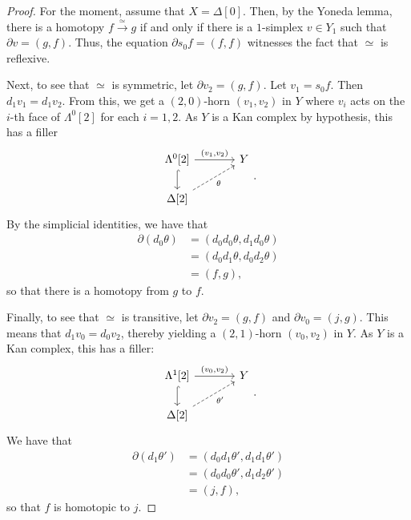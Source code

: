 \documentclass[10pt,letterpaper,cm]{nupset}
\theoremstyle{definition}
\theoremstyle{theorem}
\theoremstyle{remark}
\newcommand{\0}{\mathbf{0}}
\newcommand{\1}{\mathbf{1}}
\newcommand{\2}{\mathbf{2}}
\begin{document}
\begin{proof}
For the moment, assume that $X = \Delta[0]$. Then, by the Yoneda lemma, there is a homotopy $f \overset{\simeq}{\longrightarrow} g$ if and only if there is a $1$-simplex $v\in Y_1$ such that $\partial{v} = \left(g, f\right)$. Thus, the equation $\partial{s_0{f}} = \left(f, f\right)$ witnesses the fact that ${}\simeq{}$ is reflexive.

\medskip

Next, to see that ${}\simeq{}$  is symmetric, let $\partial{v_2} = \left(g,f\right)$. Let $v_1 = s_0{f}$. Then $d_1{v_1} = d_1{v_2}$. From this, we get a $\left(2,0\right)$-horn $\left(v_1, v_2\right)$  in $Y$ where $v_i$ acts on the $i$-th face of $ \Lambda^0[2]$ for each $i=1,2$. As $Y$ is a Kan complex by hypothesis, this has a filler
\[
\begin{tikzcd}[column sep=large]
{\Lambda^0[2]} \arrow[d, hook] \arrow[r, "{\left(v_1, v_2\right)}"] & Y \\
{\Delta[2]} \arrow[ru, "\theta"', dashed]                          &  
\end{tikzcd}
.\] By the simplicial identities, we have that 
\begin{align*}
\partial\left(d_{0} \theta\right) &=\left(d_{0} d_{0} \theta, d_{1} d_{0} \theta\right) \\
&=\left(d_{0} d_{1} \theta, d_{0} d_{2} \theta\right) \\
&=\left(f, g\right)
,\end{align*} so that there is a homotopy from $g$ to $f$.

\medskip

Finally, to see that ${}\simeq{}$  is transitive, let $\partial{v_2} = \left(g,f\right)$ and $\partial{v_0} = \left(j, g\right)$. This means that $d_1{v_0} = d_0{v_2}$, thereby yielding a $\left(2,1\right)$-horn $\left(v_0, v_2\right)$ in  $Y$. As $Y$ is a Kan complex, this has a filler:
\[
\begin{tikzcd}[column sep=large]
{\Lambda^1[2]} \arrow[d, hook] \arrow[r, "{\left(v_0, v_2\right)}"] & Y \\
{\Delta[2]} \arrow[ru, "\theta'"', dashed]                           &  
\end{tikzcd}
.\] We have that
\begin{align*}
\partial\left(d_{1} \theta'\right) &=\left(d_{0} d_{1} \theta', d_{1} d_{1} \theta'\right) \\
&=\left(d_{0} d_{0} \theta', d_{1} d_{2} \theta'\right) \\
&=\left(j, f\right),
\end{align*} so that $f$ is homotopic to $j$.


\end{proof}
\end{document}
